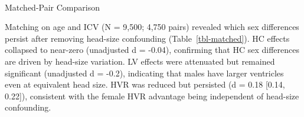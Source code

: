 \documentclass[
]{article}
\makeatletter
\let\oldparagraph\paragraph
\renewcommand{\paragraph}{
    \@ifstar
      \xxxParagraphStar
      \xxxParagraphNoStar
  }
\newcommand{\xxxParagraphStar}[1]{\oldparagraph*{#1}\mbox{}}
\newcommand{\xxxParagraphNoStar}[1]{\oldparagraph{#1}\mbox{}}
\makeatother
\begin{document}
\paragraph{Matched-Pair Comparison}\label{matched-pair-comparison}

Matching on age and ICV (N = 9,500; 4,750 pairs) revealed which sex
differences persist after removing head-size confounding
(Table~\ref{tbl-matched}). HC effects collapsed to near-zero (unadjusted
d = -0.04), confirming that HC sex differences are driven by head-size
variation. LV effects were attenuated but remained significant
(unadjusted d = -0.2), indicating that males have larger ventricles even
at equivalent head size. HVR was reduced but persisted (d = 0.18
{[}0.14, 0.22{]}), consistent with the female HVR advantage being
independent of head-size confounding.
\end{document}
